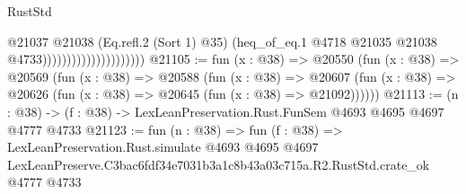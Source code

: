\begin{lexlean}{RustStd}
\begin{coremodule}
                                          @21037
                                            @21038
                                            (Eq.refl.{2} (Sort 1) @35)
                                            (heq_of_eq.{1}
                                              @4718
                                              @21035
                                              @21038
                                              @4733)))))))))))))))))))))
@21105 := fun (x : @38) =>
  @20550
    (fun (x : @38) =>
    @20569
      (fun (x : @38) =>
      @20588
        (fun (x : @38) =>
        @20607 (fun (x : @38) => @20626 (fun (x : @38) => @20645 (fun (x : @38) => @21092))))))
@21113 := (n : @38) -> (f : @38) -> LexLeanPreservation.Rust.FunSem @4693 @4695 @4697 @4777 @4733
@21123 := fun (n : @38) =>
  fun (f : @38) =>
  LexLeanPreservation.Rust.simulate
    @4693
    @4695
    @4697
    LexLeanPreserve.C3bac6fdf34e7031b3a1c8b43a03c715a.R2.RustStd.crate_ok
    @4777
    @4733
\end{coremodule}
\end{lexlean}
